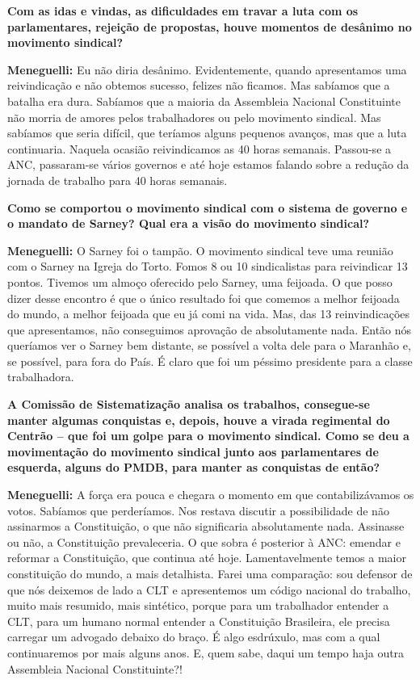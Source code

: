 \textbf{Com as idas e vindas, as dificuldades em travar a luta com os
parlamentares, rejeição de propostas, houve momentos de desânimo no
movimento sindical?}

\textbf{Meneguelli:} Eu não diria desânimo. Evidentemente, quando
apresentamos uma reivindicação e não obtemos sucesso, felizes não
ficamos. Mas sabíamos que a batalha era dura. Sabíamos que a maioria da
Assembleia Nacional Constituinte não morria de amores pelos
trabalhadores ou pelo movimento sindical. Mas sabíamos que seria
difícil, que teríamos alguns pequenos avanços, mas que a luta
continuaria. Naquela ocasião reivindicamos as 40 horas semanais.
Passou-se a ANC, passaram-se vários governos e até hoje estamos falando
sobre a redução da jornada de trabalho para 40 horas semanais.

\textbf{Como se comportou o movimento sindical com o sistema de governo
e o mandato de Sarney? Qual era a visão do movimento sindical?}

\textbf{Meneguelli:} O Sarney foi o tampão. O movimento sindical teve
uma reunião com o Sarney na Igreja do Torto. Fomos 8 ou 10 sindicalistas
para reivindicar 13 pontos. Tivemos um almoço oferecido pelo Sarney, uma
feijoada. O que posso dizer desse encontro é que o único resultado foi
que comemos a melhor feijoada do mundo, a melhor feijoada que eu já comi
na vida. Mas, das 13 reinvindicações que apresentamos, não conseguimos
aprovação de absolutamente nada. Então nós queríamos ver o Sarney bem
distante, se possível a volta dele para o Maranhão e, se possível, para
fora do País. É claro que foi um péssimo presidente para a classe
trabalhadora.

\textbf{A Comissão de Sistematização analisa os trabalhos, consegue-se
manter algumas conquistas e, depois, houve a virada regimental do
Centrão -- que foi um golpe para o movimento sindical. Como se deu a
movimentação do movimento sindical junto aos parlamentares de esquerda,
alguns do PMDB, para manter as conquistas de então?}

\textbf{Meneguelli:} A força era pouca e chegara o momento em que
contabilizávamos os votos. Sabíamos que perderíamos. Nos restava
discutir a possibilidade de não assinarmos a Constituição, o que não
significaria absolutamente nada. Assinasse ou não, a Constituição
prevaleceria. O que sobra é posterior à ANC: emendar e reformar a
Constituição, que continua até hoje. Lamentavelmente temos a maior
constituição do mundo, a mais detalhista. Farei uma comparação: sou
defensor de que nós deixemos de lado a CLT e apresentemos um código
nacional do trabalho, muito mais resumido, mais sintético, porque para
um trabalhador entender a CLT, para um humano normal entender a
Constituição Brasileira, ele precisa carregar um advogado debaixo do
braço. É algo esdrúxulo, mas com a qual continuaremos por mais alguns
anos. E, quem sabe, daqui um tempo haja outra Assembleia Nacional
Constituinte?!

